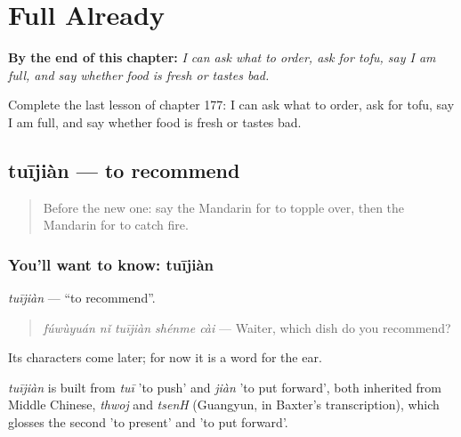 
\chapter{Full Already}
\label{ch:zh-full-already}

\begin{chapteropening}
\textbf{By the end of this chapter:} \emph{I can ask what to order, ask for tofu, say I am full, and say whether food is fresh or tastes bad.}

Complete the last lesson of chapter 177: I can ask what to order, ask for tofu, say I am full, and say whether food is fresh or tastes bad.
\end{chapteropening}

\section[tuījiàn]{tuījiàn — to recommend}

\label{lesson:ZH-C177-tuijian}



\begin{quote}
Before the new one: say the Mandarin for to topple over, then the Mandarin for to catch fire.
\end{quote}

\subsection*{You'll want to know: tuījiàn}
\emph{tuījiàn} — \textquotedblleft{}to recommend\textquotedblright{}.

\begin{quote}
\emph{fúwùyuán nǐ tuījiàn shénme cài} — Waiter, which dish do you recommend?
\end{quote}

Its characters come later; for now it is a word for the ear.

\begin{cousinweb}
\emph{tuījiàn} is built from \emph{tuī} 'to push' and \emph{jiàn} 'to put forward', both inherited from Middle Chinese, \emph{thwoj} and \emph{tsenH} (Guangyun, in Baxter's transcription), which glosses the second 'to present' and 'to put forward'.
\end{cousinweb}

